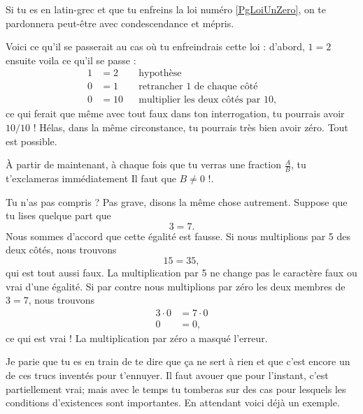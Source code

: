 \documentclass{article}
\begin{document}
\begin{loiphyz}
	Si tu es en latin-grec et que tu enfreins la loi numéro \ref{PgLoiUnZero}, on te pardonnera peut-être avec condescendance et mépris.
\end{loiphyz}

Voici ce qu'il se passerait au cas où tu enfreindrais cette loi : d'abord, $1=2$ ensuite voila ce qu'il se passe :
\begin{subequations}
\begin{align}
1&=2&&\text{hypothèse}\\
0&=1&&\text{retrancher $1$ de chaque côté}\\
0&=10&&\text{multiplier les deux côtés par 10},
\end{align}
\end{subequations}
ce qui ferait que même avec tout faux dans ton interrogation, tu pourrais avoir $10/10$ ! Hélas, dans la même circonstance, tu pourrais très bien avoir zéro. Tout est possible.

À partir de maintenant, à chaque fois que tu verras une fraction $\frac{ A }{ B }$, tu t'exclameras immédiatement \og Il faut que $B\neq 0$ !\fg.

Tu n'as pas compris ? Pas grave, disons la même chose autrement. Suppose que tu lises quelque part que
\[ 
  3=7.
\]
Nous sommes d'accord que cette égalité est fausse. Si nous multiplions par 5 des deux côtés, nous trouvons
\[ 
  15=35,
\]
qui est tout aussi faux. La multiplication par 5 ne change pas le caractère faux ou vrai d'une égalité. Si par contre nous multiplions par zéro les deux membres de $3=7$, nous trouvons
\begin{align*}
3\cdot 0&=7\cdot 0\\
  0&=0,
\end{align*}
ce qui est vrai ! La multiplication par zéro a masqué l'erreur.

Je parie que tu es en train de te dire que ça ne sert à rien et que c'est encore un de ces trucs inventés pour t'ennuyer. Il faut avouer que pour l'instant, c'est partiellement vrai; mais avec le temps tu tomberas sur des cas pour lesquels les conditions d'existences sont importantes. En attendant voici déjà un exemple.
\end{document}
